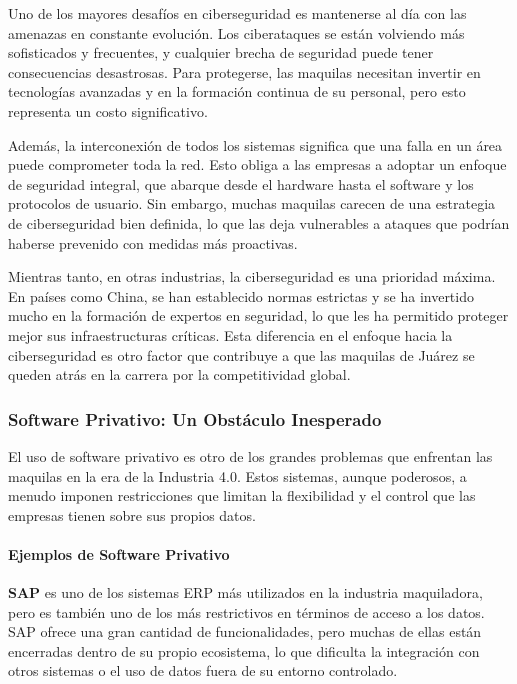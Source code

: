 \documentclass[
  10pt,
  letterpaper,
]{book}
\let\oldparagraph\paragraph
\renewcommand{\paragraph}[1]{\oldparagraph{#1}\mbox{}}
\begin{document}
Uno de los mayores desafíos en ciberseguridad es mantenerse al día con
las amenazas en constante evolución. Los ciberataques se están volviendo
más sofisticados y frecuentes, y cualquier brecha de seguridad puede
tener consecuencias desastrosas. Para protegerse, las maquilas necesitan
invertir en tecnologías avanzadas y en la formación continua de su
personal, pero esto representa un costo significativo.

Además, la interconexión de todos los sistemas significa que una falla
en un área puede comprometer toda la red. Esto obliga a las empresas a
adoptar un enfoque de seguridad integral, que abarque desde el hardware
hasta el software y los protocolos de usuario. Sin embargo, muchas
maquilas carecen de una estrategia de ciberseguridad bien definida, lo
que las deja vulnerables a ataques que podrían haberse prevenido con
medidas más proactivas.

Mientras tanto, en otras industrias, la ciberseguridad es una prioridad
máxima. En países como China, se han establecido normas estrictas y se
ha invertido mucho en la formación de expertos en seguridad, lo que les
ha permitido proteger mejor sus infraestructuras críticas. Esta
diferencia en el enfoque hacia la ciberseguridad es otro factor que
contribuye a que las maquilas de Juárez se queden atrás en la carrera
por la competitividad global.

\subsubsection{Software Privativo: Un Obstáculo
Inesperado}\label{software-privativo-un-obstuxe1culo-inesperado}

El uso de software privativo es otro de los grandes problemas que
enfrentan las maquilas en la era de la Industria 4.0. Estos sistemas,
aunque poderosos, a menudo imponen restricciones que limitan la
flexibilidad y el control que las empresas tienen sobre sus propios
datos.

\paragraph{Ejemplos de Software
Privativo}\label{ejemplos-de-software-privativo}

\textbf{SAP} es uno de los sistemas ERP más utilizados en la industria
maquiladora, pero es también uno de los más restrictivos en términos de
acceso a los datos. SAP ofrece una gran cantidad de funcionalidades,
pero muchas de ellas están encerradas dentro de su propio ecosistema, lo
que dificulta la integración con otros sistemas o el uso de datos fuera
de su entorno controlado.
\end{document}
